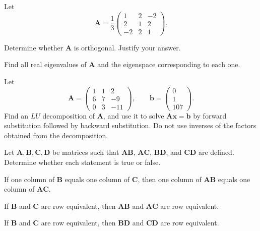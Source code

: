 \begin{problem}
Let
\[
\mathbf A=\frac13
\begin{pmatrix}
1&2&-2\\
2&1&2\\
-2&2&1
\end{pmatrix}.
\]
\begin{problemsubparts}
\item Determine whether $\mathbf A$ is orthogonal. Justify your answer.
\item Find all real eigenvalues of $\mathbf A$ and the eigenspace corresponding to each one.
\end{problemsubparts}
\end{problem}

\begin{problem}
Let
\[
\mathbf A=
\begin{pmatrix}
1&1&2\\
6&7&-9\\
0&3&-11
\end{pmatrix},
\qquad
\mathbf b=
\begin{pmatrix}0\\1\\107\end{pmatrix}.
\]
Find an $LU$ decomposition of $\mathbf A$, and use it to solve $\mathbf A\mathbf x=\mathbf b$ by forward substitution followed by backward substitution. Do not use inverses of the factors obtained from the decomposition.
\end{problem}

\begin{problem}
Let $\mathbf A,\mathbf B,\mathbf C,\mathbf D$ be matrices such that $\mathbf A\mathbf B$, $\mathbf A\mathbf C$, $\mathbf B\mathbf D$, and $\mathbf C\mathbf D$ are defined. Determine whether each statement is true or false.
\begin{problemsubparts}
\item If one column of $\mathbf B$ equals one column of $\mathbf C$, then one column of $\mathbf A\mathbf B$ equals one column of $\mathbf A\mathbf C$.
\item If $\mathbf B$ and $\mathbf C$ are row equivalent, then $\mathbf A\mathbf B$ and $\mathbf A\mathbf C$ are row equivalent.
\item If $\mathbf B$ and $\mathbf C$ are row equivalent, then $\mathbf B\mathbf D$ and $\mathbf C\mathbf D$ are row equivalent.
\end{problemsubparts}
\end{problem}


